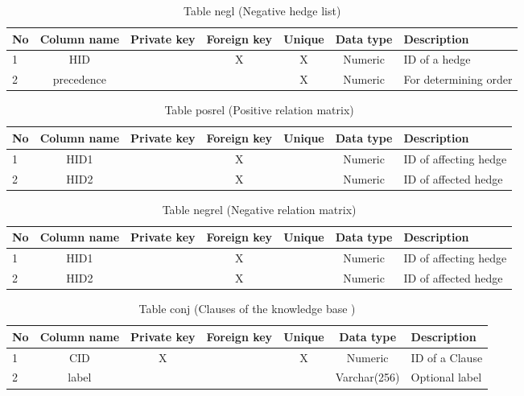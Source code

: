 \documentclass[../gr-final.tex]{subfiles}
\begin{document}
\begin{table}[H]
        \begin{tabular}{|l|c|c|c|c|c|p{2cm}|}
    \hline
    No & Column name & Private key & Foreign key & Unique & Data type & Description           \\ \hline
    1  & HID         & ~           & X           & X      & Numeric   & ID of a hedge         \\ \hline
    2  & precedence  & ~           & ~           & X      & Numeric   & For determining order \\ \hline
    \end{tabular}
    \caption {Table negl (Negative hedge list)}
\end{table}

\begin{table}[H]
        \begin{tabular}{|l|c|c|c|c|c|p{2cm}|}
    \hline
    No & Column name & Private key & Foreign key & Unique & Data type & Description           \\ \hline
    1  & HID1        & ~           & X           & ~      & Numeric   & ID of affecting hedge \\ \hline
    2  & HID2        & ~           & X           & ~      & Numeric   & ID of affected hedge  \\ \hline
    \end{tabular}
    \caption {Table posrel (Positive relation matrix)}
\end{table}

\begin{table}[H]
        \begin{tabular}{|l|c|c|c|c|c|p{2cm}|}
    \hline
    No & Column name & Private key & Foreign key & Unique & Data type & Description           \\ \hline
    1  & HID1        & ~           & X           & ~      & Numeric   & ID of affecting hedge \\ \hline
    2  & HID2        & ~           & X           & ~      & Numeric   & ID of affected hedge  \\ \hline
    \end{tabular}
    \caption {Table negrel (Negative relation matrix)}
\end{table}

\begin{table}[H]
        \begin{tabular}{|l|c|c|c|c|c|p{2cm}|}
    \hline
    No & Column name & Private key & Foreign key & Unique & Data type    & Description    \\ \hline
    1  & CID         & X           & ~           & X      & Numeric      & ID of a Clause \\ \hline
    2  & label       & ~           & ~           & ~      & Varchar(256) & Optional label \\ \hline
    \end{tabular}
    \caption {Table conj (Clauses of the knowledge base )}
\end{table}
\end{document}
